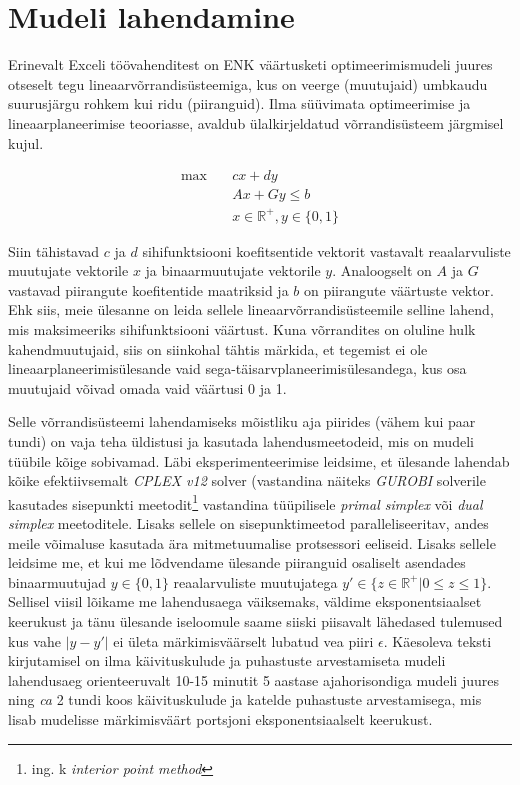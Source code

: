 \documentclass[10pt,a4paper]{article}
\begin{document}
\section{Mudeli lahendamine}
Erinevalt Exceli töövahenditest on ENK väärtusketi optimeerimismudeli juures otseselt tegu lineaarvõrrandisüsteemiga, kus on veerge (muutujaid) umbkaudu suurusjärgu rohkem kui ridu (piiranguid). Ilma süüvimata optimeerimise ja lineaarplaneerimise teooriasse, avaldub ülalkirjeldatud võrrandisüsteem järgmisel kujul.

\printindex
\begin{align}
\mathrm{max} \quad &cx + dy \nonumber\\
&Ax + Gy \leq b \nonumber \\
&x \in \mathbb{R^+}, y \in \{0,1\} \nonumber
\end{align}

Siin tähistavad $c$ ja $d$ sihifunktsiooni koefitsentide vektorit vastavalt reaalarvuliste muutujate vektorile $x$ ja binaarmuutujate vektorile $y$. Analoogselt on $A$ ja $G$ vastavad piirangute koefitentide maatriksid ja $b$ on piirangute väärtuste vektor.
Ehk siis, meie ülesanne on leida sellele lineaarvõrrandisüsteemile selline lahend, mis maksimeeriks sihifunktsiooni väärtust. Kuna võrrandites on oluline hulk kahendmuutujaid, siis on siinkohal tähtis märkida, et tegemist ei ole lineaarplaneerimisülesande vaid sega-täisarvplaneerimisülesandega, kus osa muutujaid võivad omada vaid väärtusi 0 ja 1. 

Selle võrrandisüsteemi lahendamiseks mõistliku aja piirides (vähem kui paar tundi) on vaja teha üldistusi ja kasutada lahendusmeetodeid, mis on mudeli tüübile kõige sobivamad. Läbi eksperimenteerimise leidsime, et ülesande lahendab kõike efektiivsemalt \emph{CPLEX v12} solver (vastandina näiteks \emph{GUROBI} solverile kasutades sisepunkti meetodit\footnote{ing. k \emph{interior point method}} vastandina tüüpilisele \emph{primal simplex} või \emph{dual simplex} meetoditele. Lisaks sellele on sisepunktimeetod paralleliseeritav, andes meile võimaluse kasutada ära mitmetuumalise protsessori eeliseid. Lisaks sellele leidsime me, et kui me lõdvendame ülesande piiranguid osaliselt asendades binaarmuutujad $y \in \{0,1\}$ reaalarvuliste muutujatega $y' \in \{z\in \mathbb{R^+} | 0 \leq z \leq 1\}$. Sellisel viisil lõikame me lahendusaega väiksemaks, väldime eksponentsiaalset keerukust ja tänu ülesande iseloomule saame siiski piisavalt lähedased tulemused kus vahe $|y-y'|$ ei ületa märkimisväärselt lubatud vea piiri $\epsilon$. Käesoleva teksti kirjutamisel on ilma käivituskulude ja puhastuste arvestamiseta mudeli lahendusaeg orienteeruvalt 10-15 minutit 5 aastase ajahorisondiga mudeli juures ning \emph{ca} 2 tundi koos käivituskulude ja katelde puhastuste arvestamisega, mis lisab mudelisse märkimisväärt portsjoni eksponentsiaalselt keerukust.
\end{document}
